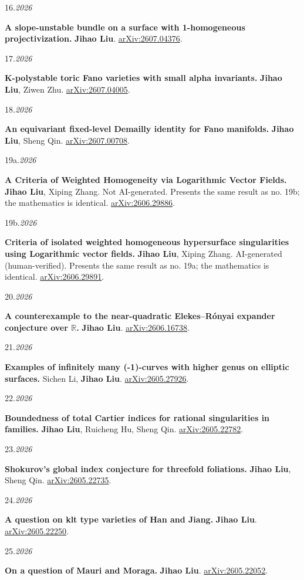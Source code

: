 \documentclass[11pt]{article}
\newlength{\datewidth}
\newcommand{\pubitem}[3]{%
  \noindent
  \begin{minipage}[t]{\datewidth}
    \raggedright\small\color{muted}#1.\;\textit{#2}
  \end{minipage}%
  \hfill%
  \begin{minipage}[t]{\dimexpr\linewidth-\datewidth-0.1in\relax}
    \raggedright #3
  \end{minipage}\par\vspace{4pt}
}
\newcommand{\paper}[1]{\textbf{#1}}
\newcommand{\me}{\textbf{Jihao Liu}}
\begin{document}
\pubitem{16}{2026}{%
  \paper{A slope-unstable bundle on a surface with 1-homogeneous projectivization.}
  \me.
  \href{https://arxiv.org/abs/2607.04376}{arXiv:2607.04376}.}


\pubitem{17}{2026}{%
  \paper{K-polystable toric Fano varieties with small alpha invariants.}
  \me, Ziwen Zhu.
  \href{https://arxiv.org/abs/2607.04005}{arXiv:2607.04005}.}


\pubitem{18}{2026}{%
  \paper{An equivariant fixed-level Demailly identity for Fano manifolds.}
  \me, Sheng Qin.
  \href{https://arxiv.org/abs/2607.00708}{arXiv:2607.00708}.}


\pubitem{19a}{2026}{%
  \paper{A Criteria of Weighted Homogeneity via Logarithmic Vector Fields.}
  \me, Xiping Zhang.
  Not AI-generated. Presents the same result as no. 19b; the mathematics is identical.
  \href{https://arxiv.org/abs/2606.29886}{arXiv:2606.29886}.}


\pubitem{19b}{2026}{%
  \paper{Criteria of isolated weighted homogeneous hypersurface singularities using Logarithmic vector fields.}
  \me, Xiping Zhang.
  AI-generated (human-verified). Presents the same result as no. 19a; the mathematics is identical.
  \href{https://arxiv.org/abs/2606.29891}{arXiv:2606.29891}.}


\pubitem{20}{2026}{%
  \paper{A counterexample to the near-quadratic Elekes--Rónyai expander conjecture over $\mathbb{R}$.}
  \me.
  \href{https://arxiv.org/abs/2606.16738}{arXiv:2606.16738}.}


\pubitem{21}{2026}{%
  \paper{Examples of infinitely many (-1)-curves with higher genus on elliptic surfaces.}
  Sichen Li, \me.
  \href{https://arxiv.org/abs/2605.27926}{arXiv:2605.27926}.}


\pubitem{22}{2026}{%
  \paper{Boundedness of total Cartier indices for rational singularities in families.}
  \me, Ruicheng Hu, Sheng Qin.
  \href{https://arxiv.org/abs/2605.22782}{arXiv:2605.22782}.}


\pubitem{23}{2026}{%
  \paper{Shokurov's global index conjecture for threefold foliations.}
  \me, Sheng Qin.
  \href{https://arxiv.org/abs/2605.22735}{arXiv:2605.22735}.}


\pubitem{24}{2026}{%
  \paper{A question on klt type varieties of Han and Jiang.}
  \me.
  \href{https://arxiv.org/abs/2605.22250}{arXiv:2605.22250}.}


\pubitem{25}{2026}{%
  \paper{On a question of Mauri and Moraga.}
  \me.
  \href{https://arxiv.org/abs/2605.22052}{arXiv:2605.22052}.}
\end{document}
